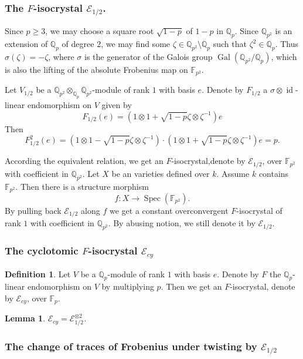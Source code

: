 \documentclass[12pt,twoside]{book}
\theoremstyle{plain}
\newtheorem{lemma}[lemma]{Lemma}
\theoremstyle{definition}
\newtheorem{definition}[definition]{Definition}
\theoremstyle{remark}
\newcommand{\bF}{{\mathbb F}}
\newcommand{\bQ}{{\mathbb Q}}
\newcommand{\mE}{{\mathcal E}}
\DeclareMathOperator\Gal{Gal}
\DeclareMathOperator\id{id}
\DeclareMathOperator\Spec{Spec}
\newcommand{\Fp}{{\mathbb{F}_p}}
\newcommand{\Qp}{{\mathbb{Q}_p}}
\numberwithin{equation}{section}
\begin{document}
\subsubsection{The $F$-isocrystal $\mE_{1/2}$.}

Since $p\geq3$, we may choose a square root $\sqrt{1-p}$ of $1-p$ in $\bQ_p$. Since $\bQ_{p^2}$ is an extension of $\bQ_p$ of degree $2$, we may find some $\zeta\in \bQ_{p^2}\setminus \bQ_p$ such that $\zeta^2 \in \bQ_{p}$. Thus $\sigma(\zeta)=-\zeta$, where $\sigma$ is the generator of the Galois group $\Gal(\bQ_{p^2}/\bQ_p)$, which is also the lifting of the absolute Frobenius map on $\bF_{p^2}$.

Let $V_{1/2}$ be a $\bQ_{p^2}\otimes_{\bQ_p}\bQ_{p^2}$-module of rank $1$ with basis $e$. Denote by $F_{1/2}$ a $\sigma\otimes\id$-linear endomorphism on $V$ given by
\[F_{1/2}(e) = (1\otimes 1 + \sqrt{1-p} \zeta\otimes \zeta^{-1}) e\]
Then
\[F_{1/2}^2(e) = (1\otimes 1 - \sqrt{1-p} \zeta\otimes \zeta^{-1})\cdot (1\otimes 1 + \sqrt{1-p} \zeta\otimes \zeta^{-1}) e = p.\]

According the equivalent relation, we get an $F$-isocrystal,denote by $\mE_{1/2}$, over $\bF_{p^2}$ with coefficient in $\bQ_{p^2}$.
Let $X$ be an varieties defined over $k$. Assume $k$ contains $\bF_{p^2}$. Then there is a structure morphism
\[f\colon X \rightarrow \Spec(\bF_{p^2}).\]
By pulling back $\mE_{1/2}$ along $f$ we get a constant overconvergent $F$-isocrystal of rank $1$ with coefficient in $\bQ_{p^2}$. By abusing notion, we still denote it by $\mE_{1/2}$.

\subsubsection{The cyclotomic $F$-isocrystal $\mathcal E_{cy}$}
\begin{definition}
Let $V$ be a $\Qp$-module of rank $1$ with basis $e$. Denote by $F$ the $\Qp$-linear endomorphism on $V$ by multiplying $p$. Then we get an $F$-isocrystal, denote by $\mathcal E_{cy}$, over $\Fp$.
\end{definition}

\begin{lemma}
$\mathcal E_{cy} = \mathcal E_{1/2}^{\otimes 2}$.
\end{lemma}


\subsubsection{The change of traces of Frobenius under twisting by $\mE_{1/2}$}
\end{document}
